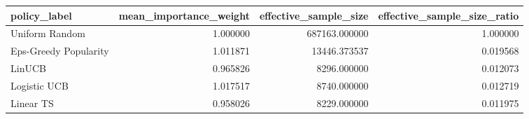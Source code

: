 \begin{tabular}{lrrr}
\toprule
         policy\_label &  mean\_importance\_weight &  effective\_sample\_size &  effective\_sample\_size\_ratio \\
\midrule
       Uniform Random &                1.000000 &          687163.000000 &                     1.000000 \\
Eps-Greedy Popularity &                1.011871 &           13446.373537 &                     0.019568 \\
               LinUCB &                0.965826 &            8296.000000 &                     0.012073 \\
         Logistic UCB &                1.017517 &            8740.000000 &                     0.012719 \\
            Linear TS &                0.958026 &            8229.000000 &                     0.011975 \\
\bottomrule
\end{tabular}
